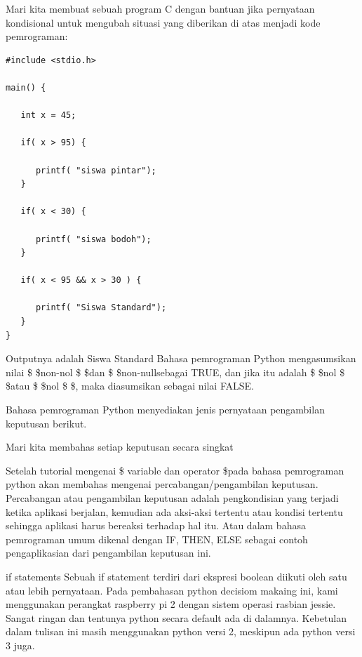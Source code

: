 Mari kita membuat sebuah program C dengan bantuan jika pernyataan kondisional untuk mengubah situasi yang diberikan di atas menjadi kode pemrograman: \par 
\begin{verbatim}
#include <stdio.h>
 
main() {
 
   int x = 45;
    
   if( x > 95) {
  
      printf( "siswa pintar");
   }
    
   if( x < 30) {
  
      printf( "siswa bodoh");
   }
    
   if( x < 95 && x > 30 ) {
  
      printf( "Siswa Standard");
   }
}
\end{verbatim}\par
Outputnya adalah Siswa Standard
\vspace{12pt}
\noindent 
Bahasa pemrograman Python mengasumsikan nilai \$  \$non-nol \$  \$dan \$  \$non-nullsebagai TRUE, dan jika itu adalah \$  \$nol \$  \$atau \$  \$nol \$  \$, maka diasumsikan sebagai nilai FALSE. \par
\vspace{12pt}
\noindent 
Bahasa pemrograman Python menyediakan jenis pernyataan pengambilan keputusan berikut. \par
\vspace{12pt}
\noindent 
Mari kita membahas setiap keputusan secara singkat  \par
\vspace{12pt}
\noindent 
Setelah tutorial mengenai \$ 
{variable dan operator}
\$pada bahasa pemrograman python akan membahas mengenai percabangan/pengambilan keputusan. Percabangan atau pengambilan keputusan adalah pengkondisian yang terjadi ketika aplikasi berjalan, kemudian ada aksi-aksi tertentu atau kondisi tertentu sehingga aplikasi harus bereaksi terhadap hal itu. Atau dalam bahasa pemrograman umum dikenal dengan IF, THEN, ELSE sebagai contoh pengaplikasian dari pengambilan keputusan ini. \par
\vspace{12pt}
if statements
Sebuah if statement terdiri dari ekspresi boolean diikuti oleh satu atau lebih pernyataan.
\noindent 
Pada pembahasan python decisiom makaing ini, kami menggunakan perangkat raspberry pi 2 dengan sistem operasi rasbian jessie. Sangat ringan dan tentunya python secara default ada di dalamnya. Kebetulan dalam tulisan ini masih menggunakan python versi 2, meskipun ada python versi 3 juga. \par
